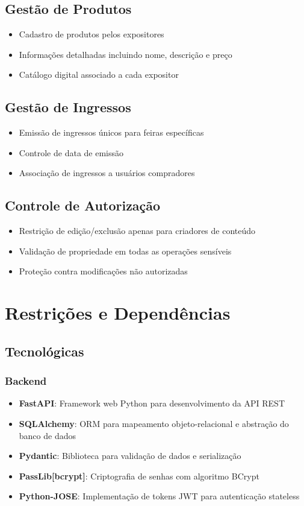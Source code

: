 \documentclass[12pt,a4paper]{article}
\begin{document}
\subsection{Gestão de Produtos}
\begin{itemize}
    \item Cadastro de produtos pelos expositores
    \item Informações detalhadas incluindo nome, descrição e preço
    \item Catálogo digital associado a cada expositor
\end{itemize}

\subsection{Gestão de Ingressos}
\begin{itemize}
    \item Emissão de ingressos únicos para feiras específicas
    \item Controle de data de emissão
    \item Associação de ingressos a usuários compradores
\end{itemize}

\subsection{Controle de Autorização}
\begin{itemize}
    \item Restrição de edição/exclusão apenas para criadores de conteúdo
    \item Validação de propriedade em todas as operações sensíveis
    \item Proteção contra modificações não autorizadas
\end{itemize}

\section{Restrições e Dependências}

\subsection{Tecnológicas}

\subsubsection{Backend}
\begin{itemize}
    \item \textbf{FastAPI}: Framework web Python para desenvolvimento da API REST
    \item \textbf{SQLAlchemy}: ORM para mapeamento objeto-relacional e abstração do banco de dados
    \item \textbf{Pydantic}: Biblioteca para validação de dados e serialização
    \item \textbf{PassLib[bcrypt]}: Criptografia de senhas com algoritmo BCrypt
    \item \textbf{Python-JOSE}: Implementação de tokens JWT para autenticação stateless
\end{itemize}
\end{document}
